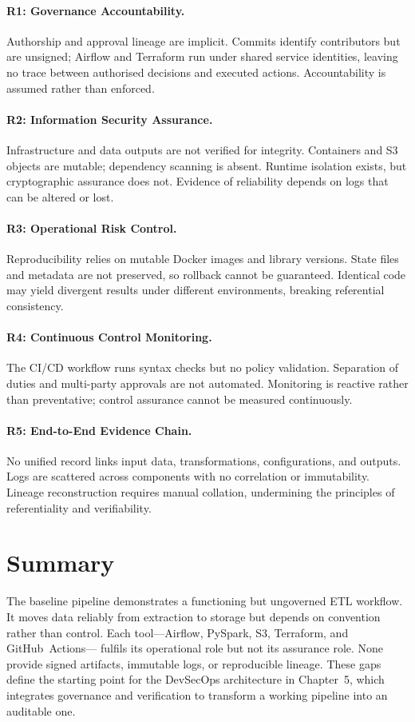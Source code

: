 \paragraph{R1: Governance Accountability.}
Authorship and approval lineage are implicit. Commits identify contributors but
are unsigned; Airflow and Terraform run under shared service identities, leaving
no trace between authorised decisions and executed actions. Accountability is
assumed rather than enforced.

\paragraph{R2: Information Security Assurance.}
Infrastructure and data outputs are not verified for integrity. Containers and
S3 objects are mutable; dependency scanning is absent. Runtime isolation exists,
but cryptographic assurance does not. Evidence of reliability depends on logs
that can be altered or lost.

\paragraph{R3: Operational Risk Control.}
Reproducibility relies on mutable Docker images and library versions. State
files and metadata are not preserved, so rollback cannot be guaranteed.
Identical code may yield divergent results under different environments,
breaking referential consistency.

\paragraph{R4: Continuous Control Monitoring.}
The CI/CD workflow runs syntax checks but no policy validation. Separation of
duties and multi-party approvals are not automated. Monitoring is reactive
rather than preventative; control assurance cannot be measured continuously.

\paragraph{R5: End-to-End Evidence Chain.}
No unified record links input data, transformations, configurations, and
outputs. Logs are scattered across components with no correlation or
immutability. Lineage reconstruction requires manual collation, undermining the
principles of referentiality and verifiability.

\section{Summary}
\noindent
The baseline pipeline demonstrates a functioning but ungoverned ETL workflow. It
moves data reliably from extraction to storage but depends on convention rather
than control. Each tool—Airflow, PySpark, S3, Terraform, and GitHub~Actions—
fulfils its operational role but not its assurance role. None provide signed
artifacts, immutable logs, or reproducible lineage. These gaps define the
starting point for the DevSecOps architecture in
Chapter~5, which integrates governance and verification to
transform a working pipeline into an auditable one.
